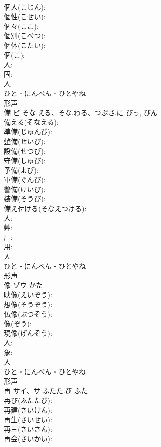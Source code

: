 \documentclass[8pt]{extreport}
\begin{document}
\begin{CJK}{UTF8}{min}
\\	個人(こじん): 
\\	個性(こせい): 
\\	個々(ここ): 
\\	個別(こべつ): 
\\	個体(こたい): 
\\	個(こ): 
\\	人: 
\\	固: 
\\	人	
\\	ひと・にんべん・ひとやね	
\\	形声 
\\	備	ビ	そな.える、そな.わる、つぶさ.に	びっ, びん	
\\	備える(そなえる): 
\\	準備(じゅんび): 
\\	整備(せいび): 
\\	設備(せつび): 
\\	守備(しゅび): 
\\	予備(よび): 
\\	軍備(ぐんび): 
\\	警備(けいび): 
\\	装備(そうび): 
\\	備え付ける(そなえつける): 
\\	人: 
\\	艸: 
\\	厂: 
\\	用: 
\\	人	
\\	ひと・にんべん・ひとやね	
\\	形声 
\\	像	ゾウ		かた	
\\	映像(えいぞう): 
\\	想像(そうぞう): 
\\	仏像(ぶつぞう): 
\\	像(ぞう): 
\\	現像(げんぞう): 
\\	人: 
\\	象: 
\\	人	
\\	ひと・にんべん・ひとやね	
\\	形声 
\\	再	サイ、サ	ふたた.び	ふた	
\\	再び(ふたたび): 
\\	再建(さいけん): 
\\	再生(さいせい): 
\\	再三(さいさん): 
\\	再会(さいかい): 

\end{CJK}
\end{document}
